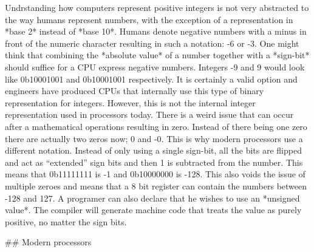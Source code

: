 {Undrstanding how computers represent positive integers is not very abstracted to the way humans
represent numbers, with the exception of a representation in *base 2* instead of *base 10*. Humans
denote negative numbers with a minus in front of the numeric character resulting in such a notation: 
-6 or -3. One might think that combining the *absolute value* of a number together with a *sign-bit*
should suffice for a CPU express negative numbers. Integers -9 and 9 would look like 0b10001001 and
0b10001001 respectively. It is certainly a valid option and engineers have produced
CPUs that internally use this type of binary representation for integers. However, this is not the 
internal integer representation used in processors today. There is a weird issue that can occur after
a mathematical operations resulting in zero. Instead of there being one zero there are actually two 
zeros now; 0 and -0. This is why modern processors use a different notation. Instead of only using a
single sign-bit, all the bits are flipped and act as “extended” sign bits and then 1 is subtracted 
from the number. This means that 0b11111111 is -1 and 0b10000000 is -128. This also voids the issue 
of multiple zeroes and means that a 8 bit register can contain the numbers between -128 and 127. 
A programer can also declare that he wishes to use an *unsigned value*. The compiler will generate
machine code that treats the value as purely positive, no matter the sign bits.


## Modern processors

}
